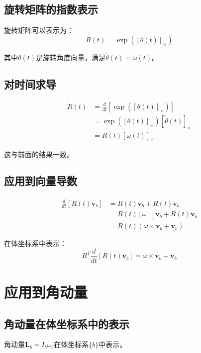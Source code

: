 \documentclass[12pt,a4paper]{article}
\begin{document}
\subsection{旋转矩阵的指数表示}

旋转矩阵可以表示为：
\begin{equation}
R(t) = \exp([\theta(t)]_{\times})
\end{equation}

其中$\theta(t)$是旋转角度向量，满足$\dot{\theta}(t) = \omega(t)$。

\subsection{对时间求导}

\begin{align}
\dot{R}(t) &= \frac{d}{dt}[\exp([\theta(t)]_{\times})] \\
&= \exp([\theta(t)]_{\times}) [\dot{\theta}(t)]_{\times} \\
&= R(t) [\omega(t)]_{\times}
\end{align}

这与前面的结果一致。

\subsection{应用到向量导数}

\begin{align}
\frac{d}{dt}[R(t) \bm{v}_b] &= \dot{R}(t) \bm{v}_b + R(t) \dot{\bm{v}}_b \\
&= R(t) [\omega]_{\times} \bm{v}_b + R(t) \dot{\bm{v}}_b \\
&= R(t) (\omega \times \bm{v}_b + \dot{\bm{v}}_b)
\end{align}

在体坐标系中表示：
\begin{equation}
R^T \frac{d}{dt}[R(t) \bm{v}_b] = \omega \times \bm{v}_b + \dot{\bm{v}}_b
\end{equation}

\section{应用到角动量}

\subsection{角动量在体坐标系中的表示}

角动量$\bm{L}_b = I_b \omega_b$在体坐标系$\{b\}$中表示。
\end{document}
